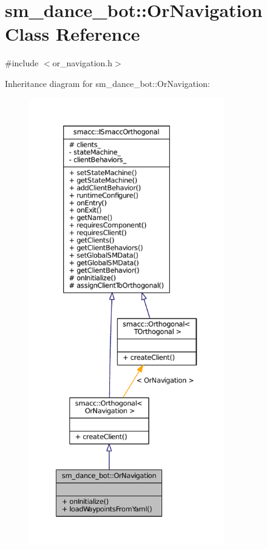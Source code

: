 \hypertarget{classsm__dance__bot_1_1OrNavigation}{}\section{sm\+\_\+dance\+\_\+bot\+:\+:Or\+Navigation Class Reference}
\label{classsm__dance__bot_1_1OrNavigation}


{\ttfamily \#include $<$or\+\_\+navigation.\+h$>$}



Inheritance diagram for sm\+\_\+dance\+\_\+bot\+:\+:Or\+Navigation\+:
\nopagebreak
\begin{figure}[H]
\begin{center}
\leavevmode
\includegraphics[height=550pt]{classsm__dance__bot_1_1OrNavigation__inherit__graph}
\end{center}
\end{figure}


